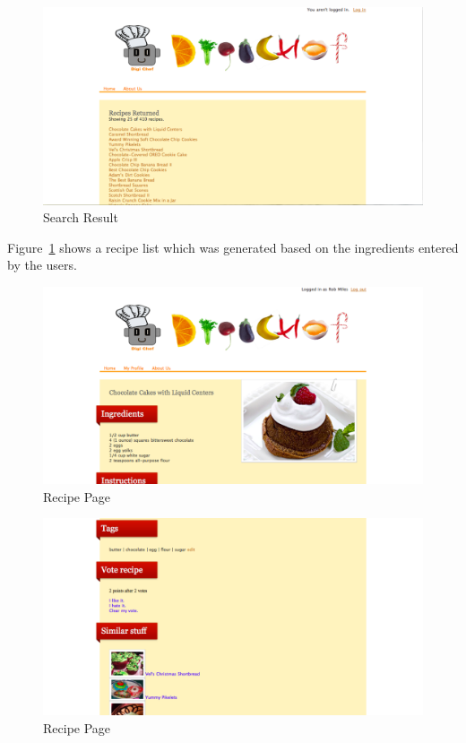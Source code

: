 \begin{figure}[H]
\includegraphics[width=1\textwidth]{result_list}
\caption{Search Result}
\label{fig:result_list}
\end{figure}

Figure~\ref{fig:result_list} shows a recipe list which was generated based on the ingredients entered by the users.

\begin{figure}[H]
\includegraphics[width=1\textwidth]{result_recipe}
\caption{Recipe Page}
\label{fig:result_recipe}
\end{figure}

\begin{figure}[H]
\includegraphics[width=1\textwidth]{result_recipe2}
\caption{Recipe Page}
\label{fig:result_recipe2}
\end{figure}

